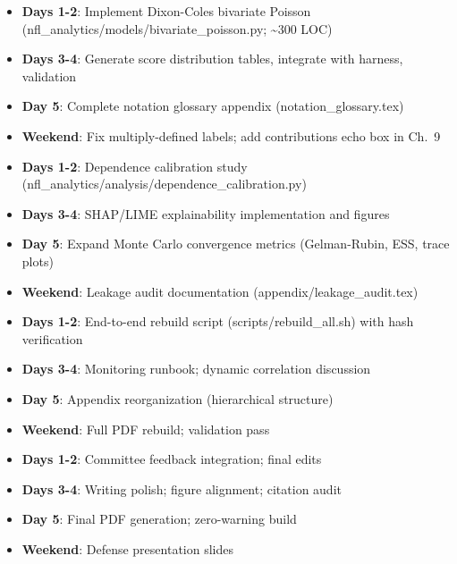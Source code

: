 
\begin{itemize}
  \item \textbf{Days 1-2}: Implement Dixon-Coles bivariate Poisson (nfl\_analytics/models/bivariate\_poisson.py; \textasciitilde300 LOC)
  \item \textbf{Days 3-4}: Generate score distribution tables, integrate with harness, validation
  \item \textbf{Day 5}: Complete notation glossary appendix (notation\_glossary.tex)
  \item \textbf{Weekend}: Fix multiply-defined labels; add contributions echo box in Ch.~9
\end{itemize}

\begin{itemize}
  \item \textbf{Days 1-2}: Dependence calibration study (nfl\_analytics/analysis/dependence\_calibration.py)
  \item \textbf{Days 3-4}: SHAP/LIME explainability implementation and figures
  \item \textbf{Day 5}: Expand Monte Carlo convergence metrics (Gelman-Rubin, ESS, trace plots)
  \item \textbf{Weekend}: Leakage audit documentation (appendix/leakage\_audit.tex)
\end{itemize}

\begin{itemize}
  \item \textbf{Days 1-2}: End-to-end rebuild script (scripts/rebuild\_all.sh) with hash verification
  \item \textbf{Days 3-4}: Monitoring runbook; dynamic correlation discussion
  \item \textbf{Day 5}: Appendix reorganization (hierarchical structure)
  \item \textbf{Weekend}: Full PDF rebuild; validation pass
\end{itemize}

\begin{itemize}
  \item \textbf{Days 1-2}: Committee feedback integration; final edits
  \item \textbf{Days 3-4}: Writing polish; figure alignment; citation audit
  \item \textbf{Day 5}: Final PDF generation; zero-warning build
  \item \textbf{Weekend}: Defense presentation slides
\end{itemize}

